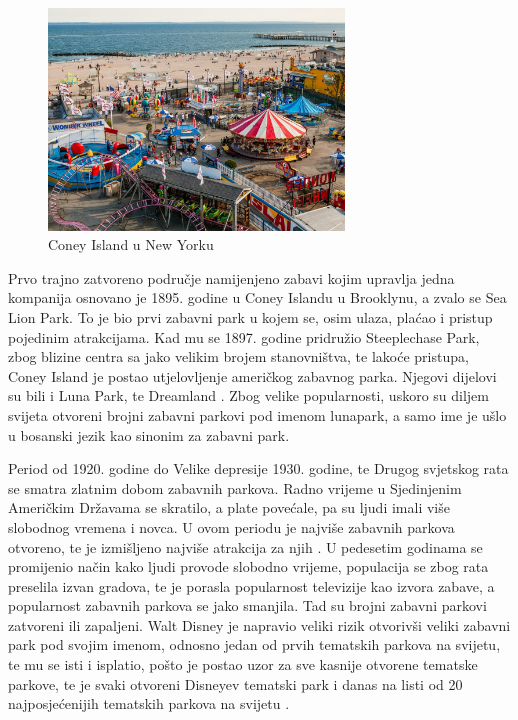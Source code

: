 \begin{figure}[h!]
  \centering
  \includegraphics[width=0.7\textwidth]{coney}
  \caption{Coney Island u New Yorku \cite{coney}}
  \label{fig:Slika_Coney}
\end{figure}

Prvo trajno zatvoreno područje namijenjeno zabavi kojim upravlja jedna kompanija osnovano je 1895. godine u Coney Islandu u Brooklynu, a zvalo se Sea Lion Park. To je bio prvi zabavni park u kojem se, osim ulaza, plaćao i pristup pojedinim atrakcijama. Kad mu se 1897. godine pridružio Steeplechase Park, zbog blizine centra sa jako velikim brojem stanovništva, te lakoće pristupa, Coney Island je postao utjelovljenje američkog zabavnog parka. Njegovi dijelovi su bili i Luna Park, te Dreamland \cite{american}. Zbog velike popularnosti, uskoro su diljem svijeta otvoreni brojni zabavni parkovi pod imenom lunapark, a samo ime je ušlo u bosanski jezik kao sinonim za zabavni park. 

Period od 1920. godine do Velike depresije 1930. godine, te Drugog svjetskog rata se smatra zlatnim dobom zabavnih parkova. Radno vrijeme u Sjedinjenim Američkim Državama se skratilo, a plate povećale, pa su ljudi imali više slobodnog vremena i novca. U ovom periodu je najviše zabavnih parkova otvoreno, te je izmišljeno najviše atrakcija za njih \cite{american}. U pedesetim godinama se promijenio način kako ljudi provode slobodno vrijeme, populacija se zbog rata preselila izvan gradova, te je porasla popularnost televizije kao izvora zabave, a popularnost zabavnih parkova se jako smanjila. Tad su brojni zabavni parkovi zatvoreni ili zapaljeni. Walt Disney je napravio veliki rizik otvorivši veliki zabavni park pod svojim imenom, odnosno jedan od prvih tematskih parkova na svijetu, te mu se isti i isplatio, pošto je postao uzor za sve kasnije otvorene tematske parkove, te je svaki otvoreni Disneyev tematski park i danas na listi od 20 najposjećenijih tematskih parkova na svijetu \cite{900years}\cite{tematski}. 

